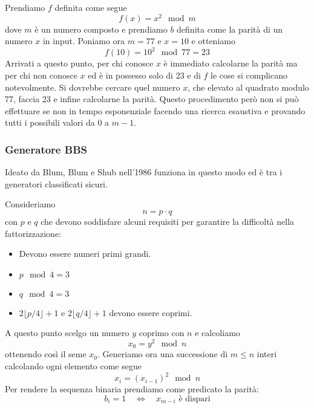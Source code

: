 \begin{example}
	Prendiamo $f$ definita come segue
	\[ f(x) = x^2 \mod{m} \]
	dove $m$ \`e un numero composto e prendiamo $b$ definita come la parit\`a di un numero $x$ in input. Poniamo ora
	$m = 77$ e $x = 10$ e otteniamo
	\[ f(10) = 10^2 \mod{77} = 23 \]
	Arrivati a questo punto, per chi conosce $x$ \`e immediato calcolarne la parit\`a ma per chi non conosce $x$ ed \`e
	in possesso solo di 23 e di $f$ le cose si complicano notevolmente. Si dovrebbe cercare quel numero $x$, che elevato
	al quadrato modulo 77, faccia 23 e infine calcolarne la parit\`a. Questo procedimento per\`o non si pu\`o effettuare
	se non in tempo esponenziale facendo una ricerca esaustiva e provando tutti i possibili valori da 0 a $m-1$.
\end{example}

\subsubsection{Generatore BBS}
Ideato da Blum, Blum e Shub nell'1986 funziona in questo modo ed \`e tra i generatori classificati sicuri.

Consideriamo
\[ n = p \cdot q \]
con $p$ e $q$ che devono soddisfare alcuni requisiti per garantire la difficolt\`a nella fattorizzazione:
\begin{itemize}
	\item Devono essere numeri primi grandi.
	\item $p \mod{4} = 3$
	\item $q \mod{4} = 3$
	\item $2 \lfloor p / 4 \rfloor + 1$ e $2 \lfloor q / 4 \rfloor + 1$ devono essere coprimi.
\end{itemize}
A questo punto scelgo un numero $y$ coprimo con $n$ e calcoliamo
\[ x_0 = y^2 \mod{n} \]
ottenendo cos\`i il seme $x_0$. Generiamo ora una successione di $m \leq n$ interi calcolando ogni elemento come segue
\[ x_i = (x_{i-1})^2 \mod{n} \]
Per rendere la sequenza binaria prendiamo come predicato la parit\`a:
\[ b_i = 1 \quad \Leftrightarrow \quad x_{m-i} \text{ \`e dispari} \]

